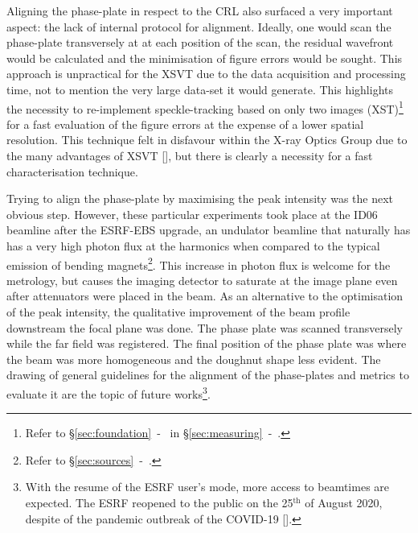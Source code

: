 \begin{refsection}
Aligning the phase-plate in respect to the CRL also surfaced a very important aspect: the lack of internal protocol for alignment. Ideally, one would scan the phase-plate transversely at at each position of the scan, the residual wavefront would be calculated and the minimisation of figure errors would be sought. This approach is unpractical for the XSVT due to the data acquisition and processing time, not to mention the very large data-set it would generate. This highlights the necessity to re-implement speckle-tracking based on only two images (XST)\footnote{Refer to \S\ref{sec:foundation}~-~\textit{} in \S\ref{sec:measuring}~-~\textit{}.} for a fast evaluation of the figure errors at the expense of a lower spatial resolution. This technique felt in disfavour within the X-ray Optics Group due to the many advantages of XSVT [\cite{Berujon2020}], but there is clearly a necessity for a fast characterisation technique.

Trying to align the phase-plate by maximising the peak intensity was the next obvious step. However, these particular experiments took place at the ID06 beamline after the ESRF-EBS upgrade, an undulator beamline that naturally has has a very high photon flux at the harmonics when compared to the typical emission of bending magnets\footnote{Refer to \S\ref{sec:sources}~-~\textit{}.}. This increase in photon flux is welcome for the metrology, but causes the imaging detector to saturate at the image plane even after attenuators were placed in the beam. As an alternative to the optimisation of the peak intensity, the qualitative improvement of the beam profile downstream the focal plane was done. The phase plate was scanned transversely while the far field was registered. The final position of the phase plate was where the beam was more homogeneous and the doughnut shape less evident. The drawing of general guidelines for the alignment of the phase-plates and metrics to evaluate it are the topic of future works\footnote{With the resume of the ESRF user's mode, more access to beamtimes are expected. The ESRF reopened to the public on the 25$^\text{th}$ of August 2020, despite of the pandemic outbreak of the COVID-19 [\cite{Cho2020}].}.


\end{refsection}

